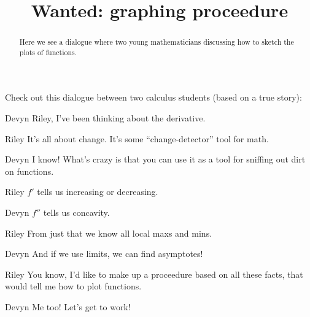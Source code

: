 \documentclass{ximera}
\title[Break-Ground:]{Wanted: graphing proceedure}
\begin{document}
\begin{abstract}
Here we see a dialogue where two young mathematicians discussing how
to sketch the plots of functions.
\end{abstract}
\maketitle

Check out this dialogue between two calculus students (based on a true
story):

\begin{dialogue}
\item[Devyn] Riley, I've been thinking about the derivative. 
\item[Riley] It's all about change. It's some ``change-detector'' tool
  for math.
\item[Devyn] I know!  What's crazy is that you can use it as a tool
  for sniffing out dirt on functions.
\item[Riley] $f'$ tells us increasing or decreasing.
\item[Devyn] $f''$ tells us concavity.
\item[Riley] From just that we know all local maxs and mins.
\item[Devyn] And if we use limits, we can find asymptotes!
\item[Riley] You know, I'd like to make up a proceedure based on all
  these facts, that would tell me how to plot functions.
\item[Devyn] Me too! Let's get to work!
\end{dialogue}
\end{document}
